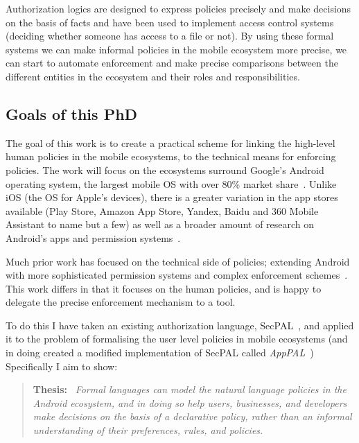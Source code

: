 \documentclass[a4paper]{scrartcl}
\begin{document}
Authorization logics are designed to express policies precisely and make
decisions on the basis of facts and have been used to implement access control
systems~\cite{martin_logic_2003} (deciding whether someone has access to a file
or not). By using these formal systems we can make informal policies in the
mobile ecosystem more precise, we can start to automate enforcement and make
precise comparisons between the different entities in the ecosystem and
their roles and responsibilities.

\subsection{Goals of this PhD}

The goal of this work is to create a practical scheme for linking the high-level
human policies in the mobile ecosystems, to the technical means for enforcing
policies. The work will focus on the ecosystems surround Google's Android
operating system, the largest mobile OS with over 80\% market
share~\cite{https://www.statista.com/statistics/236027/global-smartphone-os-market-share-of-android/_android_????}.
Unlike iOS (the OS for Apple's devices), there is a greater variation in the app
stores available (Play Store, Amazon App Store, Yandex, Baidu and 360 Mobile
Assistant to name but a few) as well as a broader amount of research on
Android's apps and permission
systems~\cite{felt_android_2012,chaudhuri_language-based_2009,lin_modeling_2014}.

Much prior work has focused on the technical side of policies; extending Android
with more sophisticated permission systems and complex enforcement
schemes~\cite{jeon_dr._2012,armando_android_2015,hornyack_these_2011}. This work
differs in that it focuses on the human policies, and is happy to delegate the
precise enforcement mechanism to a tool.

To do this I have taken an existing authorization language, SecPAL~\cite{becker_secpal:_2010}, and applied
it to the problem of formalising the user level policies in mobile ecosystems
(and in doing created a modified implementation of SecPAL called \emph{AppPAL}~\cite{hallett_apppal_2016})
Specifically I aim to show:

\begin{quote}
  \textbf{Thesis:}~\itshape
  Formal languages can model the natural language policies in the Android
  ecosystem, and in doing so help users, businesses, and developers make
  decisions on the basis of a declarative policy, rather than an informal
  understanding of their preferences, rules, and policies.
\end{quote}
\end{document}
